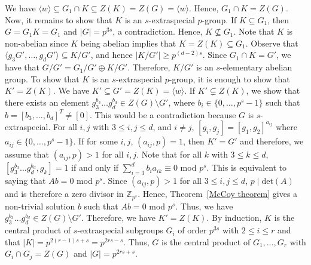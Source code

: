 \documentclass[preprint,sort&compress,12pt]{elsarticle}
\numberwithin{equation}{section}
\theoremstyle{definition}
\begin{document}
 We have  ${\langle w \rangle \subseteq G_1 \cap K \subseteq Z(K) =Z(G) = \langle w \rangle}$. Hence, ${G_1 \cap K =Z(G)}$. 
    Now, it remains to show that $K$ is an $s$-extraspecial $p$-group. If $K \subseteq G_1$, then $G=G_1K=G_1$ and $|G|=p^{3s}$,  a contradiction. Hence, $K \not\subseteq G_1$. Note that $K$ is non-abelian since $K$ being abelian implies that $K= Z(K) \subseteq G_1$.
    Observe that
    $\langle g_3G',\ldots,g_dG' \rangle \subseteq K/G'$, and hence $|K/G'|\geq p^{(d-2)s}$. Since 
    $G_1 \cap K =G'$, we have that $G/G'=G_1/G' \oplus K/G'$. Therefore,  $K/G'$ is an $s$-elementary abelian group.
    To show that $K$ is an $s$-extraspecial $p$-group, it is enough to show that $K'=Z(K)$.
    We have ${K' \subseteq G' =Z(K)=\langle w \rangle}$. If $K' \subsetneq Z(K)$, we show that there exists an element $g_3^{b_3}\ldots g_d^{b_d} \in Z(G)\setminus G'$, where $b_i \in \{0,\ldots,p^s-1\}$ such that ${b=[b_3, \ldots, b_d]^T \neq [0]}$. This would be a contradiction because $G$ is $s$-extraspecial. For all $i,j$ with $3 \leq i,j \leq d$, and $i\neq j$, $[g_i,g_j]=[g_1,g_2]^{a_{ij}}$ where ${a_{ij} \in \{0,\ldots,p^s-1\}}$. If for some $i,j$, $(a_{ij},p) = 1$, then $K'=G'$ and therefore, we assume that $(a_{ij},p) > 1$ for all $i,j$. 
    Note that for all $k$ with $3 \leq k \leq d$, $[g_3^{b_3}\ldots g_d^{b_d},g_k]=1$ if and only if $\sum \limits _{i=3}^{d}b_ia_{ik} \equiv 0$ mod $p^s$. This is equivalent to saying that $Ab=0$ mod $p^s$. Since $(a_{ij},p)>1$ for all $3 \leq i,j \leq d$, $p \mid \text{det}(A)$ and is therefore a zero divisor in $\mathbb{Z}_{p^s}$. Hence, Theorem~\ref{McCoy theorem} gives a non-trivial solution $b$ such that $Ab=0$ mod $p^s$. Thus, we have $g_3^{b_3}\ldots g_d^{b_d} \in Z(G) \setminus G'$. %
    Therefore, we have $K'=Z(K)$. By induction, $K$ is the central product of $s$-extraspecial subgroups $G_i$ of order $p^{3s}$ with $2 \leq i \leq r$ and that $|K|=p^{2(r-1)s+s}=p^{2rs-s}$. Thus, $G$ is the central product of $G_1,\ldots,G_r$ with $G_i \cap G_j=Z(G)$ and $|G|=p^{2rs+s}$.
\end{document}
